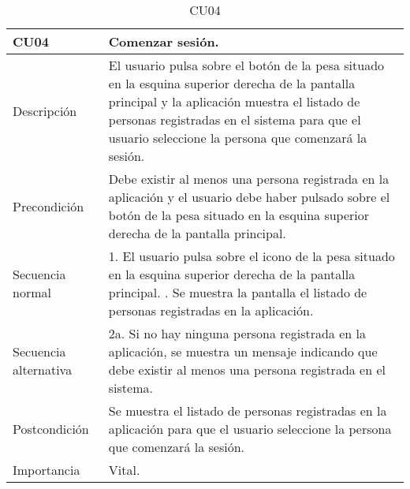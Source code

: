 \begin{table}[H]
\label{CU04}
\begin{center}
\begin{tabular}{| l | p{10cm} |}
\hline
CU04 & Comenzar sesión.\\
\hline
Descripción & El usuario pulsa sobre el botón de la pesa situado en la esquina superior derecha de la pantalla principal y la aplicación muestra el listado de personas registradas en el sistema para que el usuario seleccione la persona que comenzará la sesión.\\
\hline
Precondición & Debe existir al menos una persona registrada en la aplicación y el usuario debe haber pulsado sobre el botón de la pesa situado en la esquina superior derecha de la pantalla principal.\\
\hline
Secuencia normal & 1. El usuario pulsa sobre el icono de la pesa situado en la esquina superior derecha de la pantalla principal.
\newline 2. Se muestra la pantalla el listado de personas registradas en la aplicación.\\
\hline
Secuencia alternativa & 2a. Si no hay ninguna persona registrada en la aplicación, se muestra un mensaje indicando que debe existir al menos una persona registrada en el sistema.\\
\hline
Postcondición & Se muestra el listado de personas registradas en la aplicación para que el usuario seleccione la persona que comenzará la sesión.\\
\hline
Importancia & Vital.\\
\hline
\end{tabular}
\end{center}
\caption{CU04}
\end{table}

